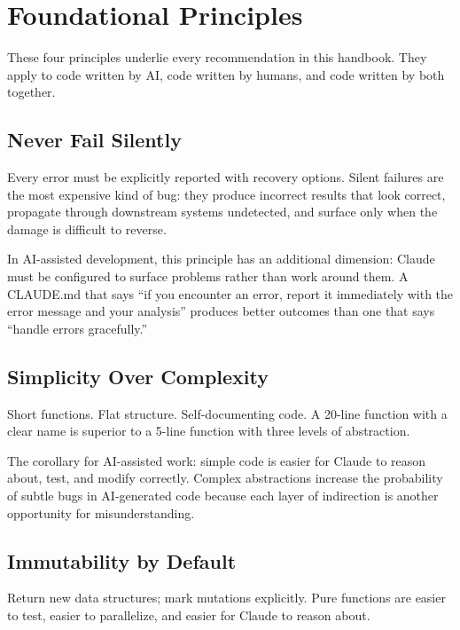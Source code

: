 \chapter{Foundational Principles}
\label{ch:principles}

These four principles underlie every recommendation in this handbook.
They apply to code written by AI, code written by humans,
and code written by both together.

\section{Never Fail Silently}

Every error must be explicitly reported with recovery options.
Silent failures are the most expensive kind of bug:
they produce incorrect results that look correct,
propagate through downstream systems undetected,
and surface only when the damage is difficult to reverse.

In AI-assisted development, this principle has an additional dimension:
Claude must be configured to surface problems rather than work around them.
A CLAUDE.md that says ``if you encounter an error, report it immediately
with the error message and your analysis'' produces better outcomes than
one that says ``handle errors gracefully.''

\section{Simplicity Over Complexity}

Short functions. Flat structure. Self-documenting code.
A 20-line function with a clear name is superior to a 5-line function
with three levels of abstraction.

The corollary for AI-assisted work: simple code is easier for Claude to
reason about, test, and modify correctly. Complex abstractions increase
the probability of subtle bugs in AI-generated code because each layer
of indirection is another opportunity for misunderstanding.

\section{Immutability by Default}

Return new data structures; mark mutations explicitly.
Pure functions are easier to test, easier to parallelize,
and easier for Claude to reason about.

